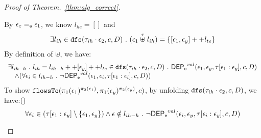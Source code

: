 \begin{proof}[Proof of Theorem.~\ref{thm:alg_correct}]
\begin{case}
\begin{subcase}
\begin{subsubcase}
By $\mathtt{\epsilon}_z =_{\mathtt{e}} \mathtt{\epsilon}_1$, we know $l_{he} = []$ and 
%
\[
\begin{array}{l}
  \exists l_{ih} \in \mathtt{dfs}(\mathtt{\tau}_{ih}\cdot \mathtt{\epsilon}_2, c, D) ~.~
   (\mathtt{\epsilon}_1 \stackrel{\mathtt{\tau}}{\uplus} l_{ih}) = \{[\mathtt{\epsilon}_1, \mathtt{\epsilon}_y] ++ l_{te}\}
\end{array}
\]
%
By definition of $\uplus$, we have:
\[
\begin{array}{l}
  \exists l_{ih-h} ~.~  l_{ih} =  l_{ih-h} ++ [\mathtt{\epsilon}_y] ++ l_{te} \in \mathtt{dfs}(\mathtt{\tau}_{ih}\cdot \mathtt{\epsilon}_2, c, D) ~.~
  \mathsf{DEP_{\mathtt{e}}}^{val}(\mathtt{\epsilon}_1, \mathtt{\epsilon}_y, \mathtt{\tau}[\mathtt{\epsilon}_1:\mathtt{\epsilon}_y], c, D)
  \\ \quad \land 
  (\forall \mathtt{\epsilon}_i \in l_{ih-h} ~.~ \neg \mathsf{DEP_{\mathtt{e}}}^{val} (\mathtt{\epsilon}_1, \mathtt{\epsilon}_i, \mathtt{\tau}[\mathtt{\epsilon}_1: \mathtt{\epsilon}_i], c, D))
\end{array}
\]
%
%
To show $\mathtt{flowsTo}(\pi_1(\mathtt{\epsilon}_1)^{\pi_2(\mathtt{\epsilon}_1)}, \pi_1(\mathtt{\epsilon}_y)^{\pi_2(\mathtt{\epsilon}_y)}, c)$, 
%
by unfolding $\mathtt{dfs}(\mathtt{\tau}_{ih}\cdot \mathtt{\epsilon}_2, c, D)$, we have:()
\[
  \forall \mathtt{\epsilon}_i \in (\mathtt{\tau}[\mathtt{\epsilon}_1:\mathtt{\epsilon}_y]\setminus \{\mathtt{\epsilon}_1, \mathtt{\epsilon}_y\}) 
 \land \mathtt{\epsilon} \notin l_{ih-h} 
 ~.~ 
 \neg \mathsf{DEP_{\mathtt{e}}}^{val} (\mathtt{\epsilon}_i, \mathtt{\epsilon}_y, \mathtt{\tau}[\mathtt{\epsilon}_i:\mathtt{\epsilon}_y], c, D)
\]
\end{subsubcase}
\end{subcase}
\end{case}
\end{proof}
